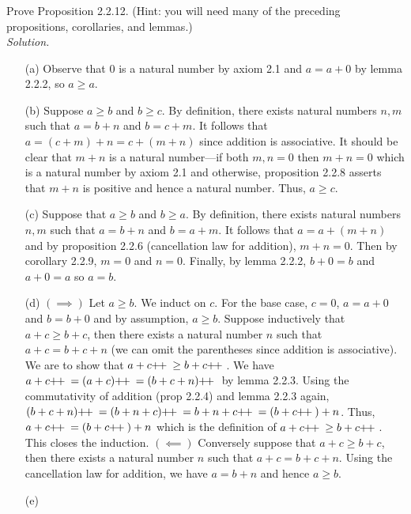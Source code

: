 \documentclass{amsart}
\theoremstyle{definition}
\newcommand{\soln}{\newline\textit{Solution.} }
\newcommand{\pls}{\mathop{\hspace{-2pt}+\hspace{-3.5pt}+{}}}
\begin{document}
\subsubsection{} Prove Proposition 2.2.12. (Hint: you will need many of the preceding propositions, corollaries, and lemmas.) \\
\soln 
\begin{enumerate}
\item[(a)] Observe that $0$ is a natural number by axiom 2.1 and $a=a+0$ by lemma 2.2.2, so $a\geq a$. 
\item[(b)] Suppose $a\geq b$ and $b\geq c$. By definition, there exists natural numbers $n,m$ such that $a=b+n$ and $b=c+m$. It follows that $a=(c+m)+n=c+(m+n)$ since addition is associative. It should be clear that $m+n$ is a natural number---if both $m,n=0$ then $m+n=0$ which is a natural number by axiom 2.1 and otherwise, proposition 2.2.8 asserts that $m+n$ is positive and hence a natural number. Thus, $a\geq c$.
\item[(c)] Suppose that $a\geq b$ and $b\geq a$. By definition, there exists natural numbers $n,m$ such that $a=b+n$ and $b=a+m$. It follows that $a=a+(m+n)$ and by proposition 2.2.6 (cancellation law for addition), $m+n=0$. Then by corollary 2.2.9, $m=0$ and $n=0$. Finally, by lemma 2.2.2, $b+0=b$ and $a+0=a$ so $a=b$.
\item[(d)] $(\implies)$ Let $a\geq b$. We induct on $c$. For the base case, $c=0$, $a=a+0$ and $b=b+0$ and by assumption, $a\geq b$. Suppose inductively that $a+c\geq b+c$, then there exists a natural number $n$ such that $a+c=b+c+n$ (we can omit the parentheses since addition is associative). We are to show that $a+c\pls\geq b+c\pls$. We have $a+c\pls=(a+c)\pls=(b+c+n)\pls$ by lemma 2.2.3. Using the commutativity of addition (prop 2.2.4) and lemma 2.2.3 again, $(b+c+n)\pls=(b+n+c)\pls=b+n+c\pls=(b+c\pls)+n$. Thus, $a+c\pls=(b+c\pls)+n$ which is the definition of $a+c\pls\geq b+c\pls$. This closes the induction. $(\impliedby)$ Conversely suppose that $a+c\geq b+c$, then there exists a natural number $n$ such that $a+c=b+c+n$. Using the cancellation law for addition, we have $a=b+n$ and hence $a\geq b$. 
\item[(e)] 
\end{enumerate}
\end{document}
